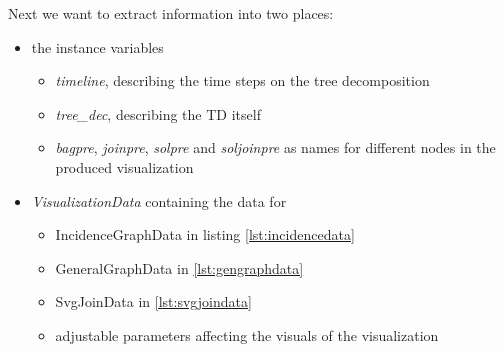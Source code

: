 \documentclass[a4paper, 12pt]{scrartcl}
\begin{document}
Next we want to extract information into two places: 
\begin{itemize}
	\item the instance variables 
	\begin{itemize}
		\item \textit{timeline}, describing the time steps on the tree decomposition
		\item \textit{tree\_dec}, describing the TD itself
		\item \textit{bagpre}, \textit{joinpre}, \textit{solpre} and \textit{soljoinpre} as names for different nodes in the produced visualization
	\end{itemize}
	\item \textit{VisualizationData} containing the data for 
	\begin{itemize}
		\item IncidenceGraphData in listing \ref{lst:incidencedata}
		\item GeneralGraphData in \ref{lst:gengraphdata}
		\item SvgJoinData in \ref{lst:svgjoindata}
		\item adjustable parameters affecting the visuals of the visualization
	\end{itemize}
\end{itemize}
\end{document}
